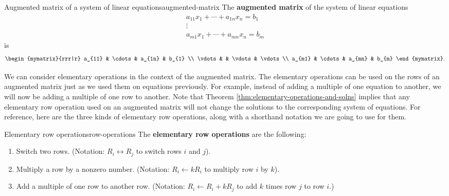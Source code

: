 \begin{definition}{Augmented matrix of a system of linear equations}{augmented-matrix}
  The \textbf{augmented matrix}
  of the system of linear equations
  \begin{equation*}
    \begin{array}{c}
      a_{11}x_{1}+\cdots +a_{1n}x_{n}=b_{1} \\
      \vdots \\
      a_{m1}x_{1}+\cdots +a_{mn}x_{n}=b_{m}
    \end{array}
  \end{equation*}
  is
  \begin{equation*}
    \begin{mymatrix}{rrr|r}
      a_{11} & \cdots & a_{1n} &  b_{1} \\
      \vdots &  & \vdots &  \vdots \\
      a_{m1} & \cdots & a_{mn} &  b_{m}
    \end{mymatrix}.
  \end{equation*}
\end{definition}

We can consider elementary operations in the context of the augmented
matrix. The elementary operations can be used on the rows of an
augmented matrix just as we used them on equations previously. For
example, instead of adding a multiple of one equation to another, we
will now be adding a multiple of one row to another. Note that Theorem
\ref{thm:elementary-operations-and-solns} implies that any elementary row
operation used on an augmented matrix will not change the solutions
to the corresponding system of equations. For reference, here are the
three kinds of elementary row operations, along with a shorthand
notation we are going to use for them.

\begin{definition}{Elementary row operations}{row-operations}
  The \textbf{elementary row operations} are the following:
  

  \begin{enumerate}
  \item Switch two rows. (Notation: $R_i\leftrightarrow R_j$ to switch
    rows $i$ and $j$).
    
  \item Multiply a row by a nonzero number.  (Notation: $R_i\leftarrow
    kR_i$ to multiply row $i$ by $k$).    
    
  \item Add a multiple of one row to another row. (Notation:
    $R_i\leftarrow R_i+kR_j$ to add $k$ times row $j$ to row $i$.)
  \end{enumerate}
\end{definition}

